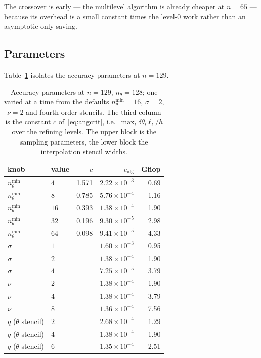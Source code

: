 \documentclass[11pt]{article}
\begin{document}
The crossover is early --- the multilevel algorithm is already cheaper at
$n=65$ --- because its overhead is a small constant times the level-0 work
rather than an asymptotic-only saving.

\subsection{Parameters}
\label{sec:knobs}

Table~\ref{tab:knobs} isolates the accuracy parameters at $n=129$.

\begin{table}[t]
\centering\small
\caption{Accuracy parameters at $n=129$, $n_\theta=128$; one varied at a
time from the defaults $n_\theta^{\min}=16$, $\sigma=2$, $\nu=2$ and
fourth-order stencils. The third column is the constant $c$
of~\eqref{eq:angcrit}, i.e.\ $\max_l \delta\theta_l \ell_l / h$ over the
refining levels. The upper block is the sampling parameters, the lower block
the interpolation stencil widths.}
\label{tab:knobs}
\begin{tabular}{llrrr}
\toprule
knob & value & $c$ & $e_{\mathrm{alg}}$ & Gflop\\
\midrule
$n_\theta^{\min}$ & $4$ & 1.571 & $2.22\!\times\!10^{-3}$ & 0.69 \\
$n_\theta^{\min}$ & $8$ & 0.785 & $5.76\!\times\!10^{-4}$ & 1.16 \\
$n_\theta^{\min}$ & $16$ & 0.393 & $1.38\!\times\!10^{-4}$ & 1.90 \\
$n_\theta^{\min}$ & $32$ & 0.196 & $9.30\!\times\!10^{-5}$ & 2.98 \\
$n_\theta^{\min}$ & $64$ & 0.098 & $9.41\!\times\!10^{-5}$ & 4.33 \\
\addlinespace
$\sigma$ & $1$ &  & $1.60\!\times\!10^{-3}$ & 0.95 \\
$\sigma$ & $2$ &  & $1.38\!\times\!10^{-4}$ & 1.90 \\
$\sigma$ & $4$ &  & $7.25\!\times\!10^{-5}$ & 3.79 \\
\addlinespace
$\nu$ & $2$ &  & $1.38\!\times\!10^{-4}$ & 1.90 \\
$\nu$ & $4$ &  & $1.38\!\times\!10^{-4}$ & 3.79 \\
$\nu$ & $8$ &  & $1.36\!\times\!10^{-4}$ & 7.56 \\
\addlinespace
$q$ ($\theta$ stencil) & $2$ &  & $2.68\!\times\!10^{-4}$ & 1.29 \\
$q$ ($\theta$ stencil) & $4$ &  & $1.38\!\times\!10^{-4}$ & 1.90 \\
$q$ ($\theta$ stencil) & $6$ &  & $1.35\!\times\!10^{-4}$ & 2.51 \\

\end{tabular}
\end{table}
\end{document}
